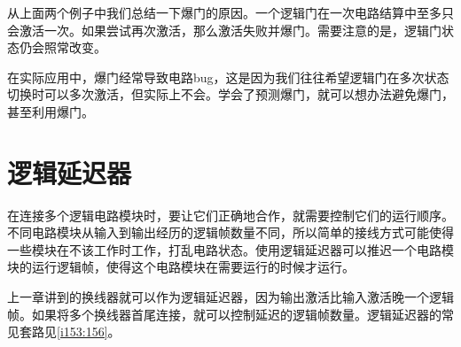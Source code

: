 \begin{figure}
\begin{center}
\qquad
{}
\qquad
{}
\end{center}
\caption{}\label{i306:308}
\end{figure}

从上面两个例子中我们总结一下爆门的原因。一个逻辑门在一次电路结算中至多只会激活一次。如果尝试再次激活，那么激活失败并爆门。需要注意的是，逻辑门状态仍会照常改变。

在实际应用中，爆门经常导致电路bug，这是因为我们往往希望逻辑门在多次状态切换时可以多次激活，但实际上不会。学会了预测爆门，就可以想办法避免爆门，甚至利用爆门。

\section{逻辑延迟器}

在连接多个逻辑电路模块时，要让它们正确地合作，就需要控制它们的运行顺序。不同电路模块从输入到输出经历的逻辑帧数量不同，所以简单的接线方式可能使得一些模块在不该工作时工作，打乱电路状态。使用逻辑延迟器可以推迟一个电路模块的运行逻辑帧，使得这个电路模块在需要运行的时候才运行。

上一章讲到的换线器就可以作为逻辑延迟器，因为输出激活比输入激活晚一个逻辑帧。如果将多个换线器首尾连接，就可以控制延迟的逻辑帧数量。逻辑延迟器的常见套路见\autoref{i153:156}。

